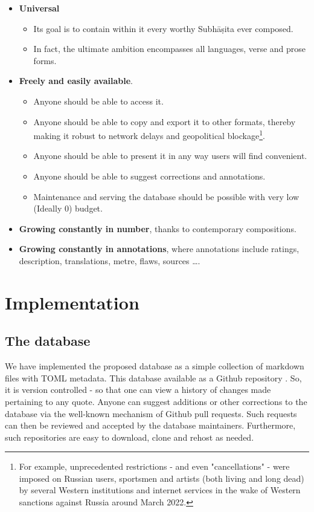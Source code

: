 \documentclass[11pt]{article}
\begin{document}
\begin{itemize}
\tightlist
\item
  \textbf{Universal}

  \begin{itemize}
  \tightlist
  \item
    Its goal is to contain within it every worthy Subhāṣita ever
    composed.
  \item
    In fact, the ultimate ambition encompasses all languages, verse
    and prose forms.
  \end{itemize}

\item
  \textbf{Freely and easily available}.

  \begin{itemize}
  \tightlist
  \item
     Anyone should be able to access it.
  \item
     Anyone should be able to copy and export it to other formats, thereby making it robust to network delays and geopolitical blockage\footnote{For example, unprecedented restrictions - and even "cancellations" - were imposed on Russian users, sportsmen and artists (both living and long dead) by several Western institutions and internet services in the wake of Western sanctions against Russia around March 2022.}. 
  \item
     Anyone should be able to present it in any way users will find convenient.
  \item
     Anyone should be able to suggest corrections and annotations. 
  \item
     Maintenance and serving the database should be possible with very low (Ideally 0) budget. 
  \end{itemize}
\item
  \textbf{Growing constantly in number}, thanks to contemporary compositions.
\item
  \textbf{Growing constantly in annotations}, where annotations include ratings, description, translations, metre, flaws, sources \ldots.
\end{itemize}

\section{Implementation}
\subsection{The database}
We have implemented the proposed database as a simple collection of markdown files with TOML metadata. This database available as a Github repository \cite{subhaashita_db_sa_padya}. So, it is version controlled - so that one can view a history of changes made pertaining to any quote. Anyone can suggest additions or other corrections to the database via the well-known mechanism of Github pull requests. Such requests can then be reviewed and accepted by the database maintainers. Furthermore, such repositories are easy to download, clone and rehost as needed. 
\end{document}
